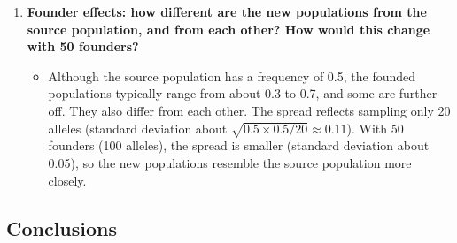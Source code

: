 \documentclass[
  a4paper]{book}
\providecommand{\tightlist}{%
  \setlength{\itemsep}{0pt}\setlength{\parskip}{0pt}}
\begin{document}
\begin{enumerate}
  \begin{itemize}
  \tightlist
  \item
    The arithmetic mean is 792.1 (79 generations at 1000 and 21 at 10), but the harmonic mean is only about 46 (\texttt{1\ /\ mean(1\ /\ N)} = 45.9). So the population loses diversity as if it had about 46 individuals throughout, not 790. A few generations at small size dominate the long-term effect of drift: \(N_e\) is much closer to the smallest population sizes than to the average. (Compare the lecture's example, 1,000, then 10, then 1,000, which gives \(N_e \approx 29\) against an arithmetic mean of 670.) This is one reason why \(N_e\) is usually much smaller than the census size in real populations.
  \end{itemize}
\item
  \textbf{Founder effects: how different are the new populations from the source population, and from each other? How would this change with 50 founders?}

  \begin{itemize}
  \tightlist
  \item
    Although the source population has a frequency of 0.5, the founded populations typically range from about 0.3 to 0.7, and some are further off. They also differ from each other. The spread reflects sampling only 20 alleles (standard deviation about \(\sqrt{0.5 \times 0.5 / 20} \approx 0.11\)). With 50 founders (100 alleles), the spread is smaller (standard deviation about 0.05), so the new populations resemble the source population more closely.
  \end{itemize}
\end{enumerate}

\subsection{Conclusions}\label{conclusions-1}
\end{document}
